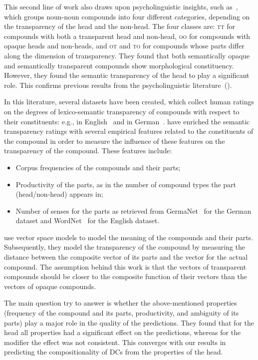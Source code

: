 \documentclass[output=paper]{langsci/langscibook}
\begin{document}
This  second line of work also draws upon psycholinguistic insights,  such as~\citet{Libben:1997,Libben:2003}, which groups noun-noun compounds into four different categories, depending on the transparency of the head and the non-head.
The four classes are:
 {\textsc{tt}} for compounds with both a transparent head and non-head,
 {\textsc{oo}} for compounds with opaque heads and non-heads,
and  {\textsc{ot}} and  {\textsc{to}} for compounds whose parts differ along the dimension of transparency. They found that both semantically opaque and semantically transparent compounds show morphological constituency. However, they found the semantic transparency of the head to play a significant role. This confirms previous results from the psycholinguistic literature~(\cite{Zwitserlood:1994}). 

 {In this literature, several datasets have been created, which collect human ratings on the degrees of lexico-semantic transparency of compounds with respect to their constituents: e.g., in English~\citep{Reddy:2011,Juhaszetal:2015} and in German~\citep{SchulteImWaldeEtAl:16a}.} 
\cite{SchulteImWaldeEtAl:16a} have enriched the semantic transparency ratings with several empirical features related to the  {constituents} of the compound in order to measure the influence of these features on the  {transparency} of the compound. These features include:
\begin{itemize}
\item Corpus frequencies of the compounds and their parts;
\item Productivity of the parts, as in the number of compound types the part (head/non-head) appears in;
\item Number of senses for the parts as retrieved from GermaNet~\citep{hamp:97,heinrich:10} for the German dataset and WordNet~\citep{fellbaum:98} for the English dataset.
\end{itemize}

\cite{SchulteImWaldeEtAl:16} use vector space models to model the meaning of the compounds and their parts. Subsequently, they model the  {transparency} of the compound by measuring the distance between the composite vector of its parts and the vector for the actual compound. The assumption behind this work is that the vectors of  {transparent} compounds should be closer to the composite function of their vectors than the vectors of  {opaque} compounds. 

The main question \cite{SchulteImWaldeEtAl:16} try to answer  
is whether the above-mentioned properties (frequency of the compound and its parts, productivity, and ambiguity of its parts) play a major role in the  quality of the predictions. They found that for the head all properties had a significant effect on the predictions, whereas for the modifier the effect was not consistent. This converges with our results in predicting the compositionality of DCs from the properties of the head.
\end{document}
